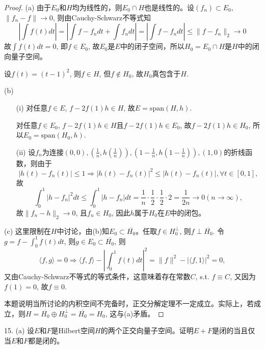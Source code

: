 \documentclass[a4paper,8pt]{ctexart}\textwidth 140mm \textheight 216mm
\newcommand{\8}{\infty}
\newcommand{\la}{\langle}
\newcommand{\ra}{\rangle}
\begin{document}
\begin{proof}
	(a) 由于$E_0$和$H$均为线性的，则$E_0\cap H$也是线性的。设$(f_n)\subset E_0$, $\|f_n-f\|\to 0$, 则由Cauchy-Schwarz不等式知
	\begin{equation*}
	|\int f(t)dt|=|\int f-f_ndt+\int f_ndt|=|\int f-f_ndt|\leq \|f-f_n\|_2\to 0
	\end{equation*}
	故$\int f(t)dt=0$, 即$f\in E_0$, 故$E_0$是$E$中的闭子空间，所以$H_0=E_0\cap H$是$H$中的闭向量子空间。
	
	设$f(t)=(t-1)^2$, 则$f\in H$, 但$f\notin H_0$, 故$H_0$真包含于$H$. 
	
	(b) \begin{enumerate}
		\item[(i)] 对任意$f\in E$, $f-2f(1)h\in H$, 故$E=\mathrm{span}(H,h)$.
		
		对任意$f\in E_0$, $f-2f(1)h\in H$且$f-2f(1)h\in E_0$, 故$f-2f(1)h\in H_0$, 所以$E_0=\mathrm{span}(H_0,h)$.
		
		\item[(ii)] 设$f_n$为连接$(0,0),(\frac{1}{n},h(\frac{1}{n})),(1-\frac{1}{n},h(1-\frac
		{1}{n})), (1,0)$的折线函数，则由于
		$$|h(t)-f_n(t)|\leq 1\Rightarrow |h(t)-f_n(t)|^2\leq |h(t)-f_n(t)|,\forall t\in[0,1],$$ 
		故
		\begin{equation*}
		\int_0^1|h-f_n|^2 dt\leq \int_0^1|h-f_n|dt=\frac{1}{n}\cdot\frac{1}{2}\cdot\frac{1}{2}\cdot 2=\frac{1}{2n}\to 0(n\to \infty),
		\end{equation*}
		故$\|f_n-h\|_2\to 0$, 且$f_n\in H_0$, 因此$h$属于$H_0$在$E$中的闭包。
	\end{enumerate}
	(c) 这里限制在$H$中讨论，由(b)知$E_0\subset\overline{H_0}$。任取$f\in H_0^\perp$, 则$f\perp\overline{H_0}$. 令$g=f-\int_0^1 f(t)dt$, 则$g\in E_0\subset \overline{H_0}$, 则
	\begin{equation}
	\la f,g\ra=0\Rightarrow \la f,f\ra-|\int_0^1 f(t)dt|^2=\|f\|^2-|\la f,1\ra|^2=0,
	\end{equation}
	又由Cauchy-Schwarz不等式的等式条件，这意味着存在常数$C$, s.t. $f\equiv C$, 又因为$f(1)=0$, 故$f\equiv 0$. 
	
	本题说明当所讨论的内积空间不完备时，正交分解定理不一定成立。实际上，若成立，则$H=\overline{H_0}\oplus H_0^\perp=\overline{H_0}=H_0$, 这与(a)矛盾。
\end{proof}

15. (a) 设$E$和$F$是Hilbert空间$H$的两个正交向量子空间。证明$E+F$是闭的当且仅当$E$和$F$都是闭的。
\end{document}
